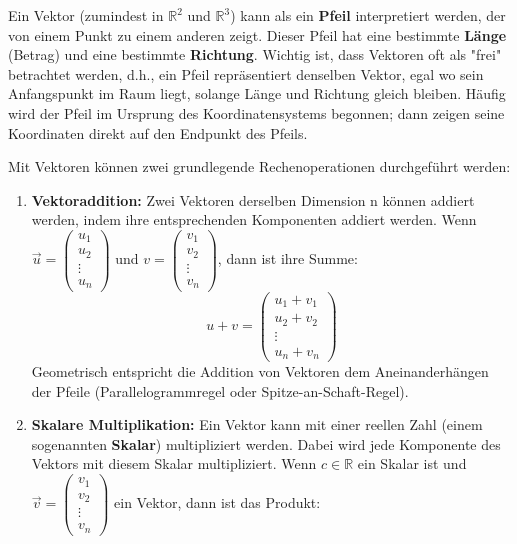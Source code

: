 Ein Vektor (zumindest in $\mathbb{R}^2$ und $\mathbb{R}^3$) kann als ein
\textbf{Pfeil} interpretiert werden, der von einem Punkt zu einem anderen
zeigt. Dieser Pfeil hat eine bestimmte \textbf{Länge} (Betrag) und eine
bestimmte \textbf{Richtung}. Wichtig ist, dass Vektoren oft als "frei"
betrachtet werden, d.h., ein Pfeil repräsentiert denselben Vektor, egal wo sein
Anfangspunkt im Raum liegt, solange Länge und Richtung gleich bleiben. Häufig
wird der Pfeil im Ursprung des Koordinatensystems begonnen; dann zeigen seine
Koordinaten direkt auf den Endpunkt des Pfeils.

Mit Vektoren können zwei grundlegende Rechenoperationen durchgeführt werden:
%
\begin{enumerate}
    \item \textbf{Vektoraddition:} Zwei Vektoren derselben Dimension n können addiert werden, indem ihre entsprechenden Komponenten addiert werden. Wenn $\vec{u} = \begin{pmatrix}
                  u_1 \\ u_2 \\ \vdots \\ u_n
              \end{pmatrix}$ und $v = \begin{pmatrix}
                  v_1 \\ v_2 \\ \vdots \\ v_n
              \end{pmatrix}$, dann ist ihre Summe:
          \[
              u + v = \begin{pmatrix}
                  u_1 + v_1 \\ u_2 + v_2 \\ \vdots \\ u_n + v_n
              \end{pmatrix}
          \]
          Geometrisch entspricht die Addition von Vektoren dem Aneinanderhängen der
          Pfeile (Parallelogrammregel oder Spitze-an-Schaft-Regel).

    \item \textbf{Skalare Multiplikation:} Ein Vektor kann mit einer reellen Zahl (einem sogenannten \textbf{Skalar}) multipliziert werden. Dabei wird jede Komponente des Vektors mit diesem Skalar multipliziert. Wenn $c \in \mathbb{R}$ ein Skalar ist und $\vec{v} = \begin{pmatrix} v_1 \\ v_2 \\ \vdots \\ v_n \end{pmatrix}$ ein Vektor, dann ist das Produkt:


\end{enumerate}
